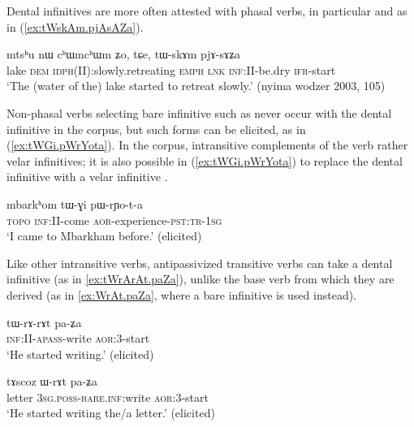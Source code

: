 Dental infinitives are more often attested with phasal verbs, in particular  and  as in (\ref{ex:tWskAm.pjAsAZa}).

\begin{exe}
\ex \label{ex:tWskAm.pjAsAZa}
\gll mtsʰu nɯ cʰɯmcʰɯm ʑo, tɕe, tɯ-skɤm pjɤ-sɤʑa \\
lake \textsc{dem} \textsc{idph}(II):slowly.retreating \textsc{emph} \textsc{lnk} \textsc{inf}:II-be.dry \textsc{ifr}-start \\
\glt `The (water of the) lake started to retreat slowly.' (nyima wodzer 2003, 105)
\end{exe}

Non-phasal verbs selecting bare infinitive such as  never occur with the dental infinitive in the corpus, but such forms can be elicited, as in (\ref{ex:tWGi.pWrYota}). In the corpus, intransitive complements of the verb  rather velar infinitives; it is also possible  in (\ref{ex:tWGi.pWrYota}) to replace the dental infinitive  with a velar infinitive .

\begin{exe}
\ex \label{ex:tWGi.pWrYota}
\gll  mbarkʰom tɯ-ɣi pɯ-rɲo-t-a  \\
\textsc{topo} \textsc{inf}:II-come \textsc{aor}-experience-\textsc{pst}:\textsc{tr}-\textsc{1sg} \\
\glt `I came to Mbarkham before.' (elicited)
\end{exe}

Like other intransitive verbs, antipassivized transitive verbs can take a dental infinitive (as in \ref{ex:tWrArAt.paZa}), unlike the base verb from which they are derived (as in \ref{ex:WrAt.paZa}, where a bare infinitive is used instead).

\begin{exe}
\ex \label{ex:tWrArAt.paZa}
\gll tɯ-rɤ-rɤt pa-ʑa \\
\textsc{inf}:II-\textsc{apass}-write \textsc{aor}:3\flobv{}-start \\
\glt `He started writing.' (elicited)
\end{exe}

\begin{exe}
\ex \label{ex:WrAt.paZa}
\gll tɤscoz ɯ-rɤt pa-ʑa \\
letter \textsc{3sg}.\textsc{poss}-\textsc{bare}.\textsc{inf:}write \textsc{aor}:3\flobv{}-start \\
\glt `He started writing the/a letter.' (elicited)
\end{exe}

